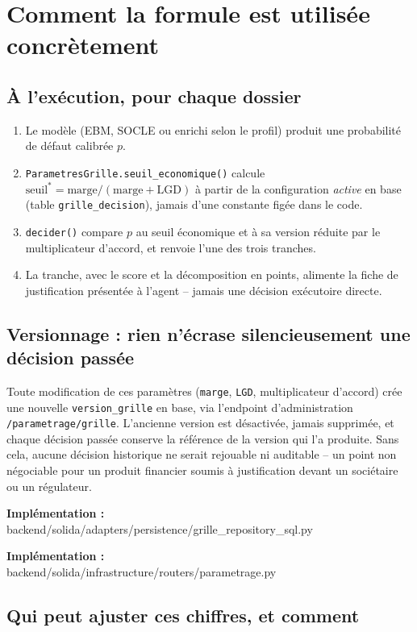 \documentclass[11pt,a4paper]{article}
\newcommand{\fichier}[1]{\noindent\textbf{Implémentation :} \\ \tiny\ttfamily#1\normalfont\normalsize\par}
\begin{document}
\section{Comment la formule est utilisée concrètement}

\subsection{À l'exécution, pour chaque dossier}

\begin{enumerate}
\item Le modèle (EBM, SOCLE ou enrichi selon le profil) produit une probabilité de défaut
calibrée $p$.
\item \texttt{ParametresGrille.seuil\_economique()} calcule
$\text{seuil}^{*} = \text{marge}/(\text{marge}+\text{LGD})$ à partir de la configuration
\emph{active} en base (table \texttt{grille\_decision}), jamais d'une constante figée dans le code.
\item \texttt{decider()} compare $p$ au seuil économique et à sa version réduite par le
multiplicateur d'accord, et renvoie l'une des trois tranches.
\item La tranche, avec le score et la décomposition en points, alimente la fiche de justification
présentée à l'agent -- jamais une décision exécutoire directe.
\end{enumerate}

\subsection{Versionnage : rien n'écrase silencieusement une décision passée}

Toute modification de ces paramètres (\texttt{marge}, \texttt{LGD}, multiplicateur d'accord) crée
une nouvelle \texttt{version\_grille} en base, via l'endpoint d'administration
\texttt{/parametrage/grille}. L'ancienne version est désactivée, jamais supprimée, et chaque décision passée
conserve la référence de la version qui l'a produite. Sans cela, aucune décision historique ne
serait rejouable ni auditable -- un point non négociable pour un produit financier soumis à
justification devant un sociétaire ou un régulateur.

\fichier{backend/solida/adapters/persistence/grille\_repository\_sql.py}
\fichier{backend/solida/infrastructure/routers/parametrage.py}

\subsection{Qui peut ajuster ces chiffres, et comment}
\end{document}
